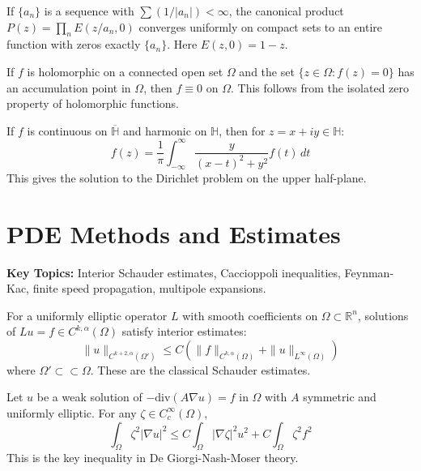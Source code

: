 \begin{example}
If $\{a_n\}$ is a sequence with $\sum (1/|a_n|) < \infty$, the canonical product $P(z) = \prod_n E(z/a_n, 0)$ converges uniformly on compact sets to an entire function with zeros exactly $\{a_n\}$. Here $E(z,0) = 1-z$.
\end{example}

\begin{example}
If $f$ is holomorphic on a connected open set $\Omega$ and the set $\{z \in \Omega : f(z) = 0\}$ has an accumulation point in $\Omega$, then $f \equiv 0$ on $\Omega$. This follows from the isolated zero property of holomorphic functions.
\end{example}

\begin{example}
If $f$ is continuous on $\overline{\mathbb{H}}$ and harmonic on $\mathbb{H}$, then for $z = x+iy \in \mathbb{H}$:
\[ f(z) = \frac{1}{\pi} \int_{-\infty}^\infty \frac{y}{(x-t)^2 + y^2} f(t)\,dt \]
This gives the solution to the Dirichlet problem on the upper half-plane.
\end{example}

\section{PDE Methods and Estimates}

\textbf{Key Topics:} Interior Schauder estimates, Caccioppoli inequalities, Feynman-Kac, finite speed propagation, multipole expansions.

\begin{example}
For a uniformly elliptic operator $L$ with smooth coefficients on $\Omega \subset \mathbb{R}^n$, solutions of $Lu = f \in C^{k,\alpha}(\Omega)$ satisfy interior estimates:
\[ \|u\|_{C^{k+2,\alpha}(\Omega')} \leq C(\|f\|_{C^{k,\alpha}(\Omega)} + \|u\|_{L^\infty(\Omega)}) \]
where $\Omega' \subset\subset \Omega$. These are the classical Schauder estimates.
\end{example}

\begin{example}
Let $u$ be a weak solution of $-\mathrm{div}(A\nabla u) = f$ in $\Omega$ with $A$ symmetric and uniformly elliptic. For any $\zeta \in C_c^\infty(\Omega)$,
\[ \int_\Omega \zeta^2 |\nabla u|^2 \leq C \int_\Omega |\nabla \zeta|^2 u^2 + C \int_\Omega \zeta^2 f^2 \]
This is the key inequality in De Giorgi-Nash-Moser theory.
\end{example}

